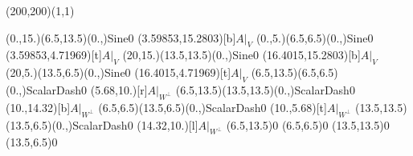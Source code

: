 \unitlength=1bp%

\begin{feynartspicture}(200,200)(1,1)

\FADiagram{}
\FAProp(0.,15.)(6.5,13.5)(0.,){Sine}{0}
\FALabel(3.59853,15.2803)[b]{$A|_V$}
\FAProp(0.,5.)(6.5,6.5)(0.,){Sine}{0}
\FALabel(3.59853,4.71969)[t]{$A|_V$}
\FAProp(20,15.)(13.5,13.5)(0.,){Sine}{0}
\FALabel(16.4015,15.2803)[b]{$A|_V$}
\FAProp(20,5.)(13.5,6.5)(0.,){Sine}{0}
\FALabel(16.4015,4.71969)[t]{$A|_V$}
\FAProp(6.5,13.5)(6.5,6.5)(0.,){ScalarDash}{0}
\FALabel(5.68,10.)[r]{$A|_{W^\perp}$}
\FAProp(6.5,13.5)(13.5,13.5)(0.,){ScalarDash}{0}
\FALabel(10.,14.32)[b]{$A|_{W^\perp}$}
\FAProp(6.5,6.5)(13.5,6.5)(0.,){ScalarDash}{0}
\FALabel(10.,5.68)[t]{$A|_{W^\perp}$}
\FAProp(13.5,13.5)(13.5,6.5)(0.,){ScalarDash}{0}
\FALabel(14.32,10.)[l]{$A|_{W^\perp}$}
\FAVert(6.5,13.5){0}
\FAVert(6.5,6.5){0}
\FAVert(13.5,13.5){0}
\FAVert(13.5,6.5){0}
\end{feynartspicture}

